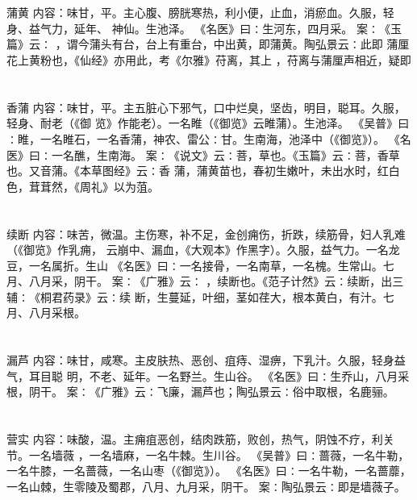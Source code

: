 \documentclass[12pt,UTF8]{ctexbook}
\begin{document}
\chapter{}蒲黄
内容：味甘，平。主心腹、膀胱寒热，利小便，止血，消瘀血。久服，轻身、益气力，延年、 
神仙。生池泽。 
《名医》曰∶生河东，四月采。 
案∶《玉篇》云∶ ，谓今蒲头有台，台上有重台，中出黄，即蒲黄。陶弘景云∶此即 
蒲厘花上黄粉也，《仙经》亦用此，考《尔雅》苻离，其上 ，苻离与蒲厘声相近，疑即 


\chapter{}香蒲
内容：味甘，平。主五脏心下邪气，口中烂臭，坚齿，明目，聪耳。久服，轻身、耐老（《御 
览》作能老）。一名睢（《御览》云睢蒲）。生池泽。 
《吴普》曰∶睢，一名睢石，一名香蒲，神农、雷公∶甘。生南海，池泽中（《御览》）。 
《名医》曰∶一名醮，生南海。 
案∶《说文》云∶菩，草也。《玉篇》云∶菩，香草也。又音蒲。《本草图经》云∶香 
蒲，蒲黄苗也，春初生嫩叶，未出水时，红白色，茸茸然，《周礼》以为菹。 


\chapter{}续断
内容：味苦，微温。主伤寒，补不足，金创痈伤，折跌，续筋骨，妇人乳难（《御览》作乳痈， 
云崩中、漏血，《大观本》作黑字）。久服，益气力。一名龙豆，一名属折。生山 
《名医》曰∶一名接骨，一名南草，一名槐。生常山。七月、八月采，阴干。 
案∶《广雅》云∶ ，续断也。《范子计然》云∶续断，出三辅∶《桐君药录》云∶续 
断，生蔓延，叶细，茎如荏大，根本黄白，有汁。七月、八月采根。 


\chapter{}漏芦
内容：味甘，咸寒。主皮肤热、恶创、疽痔、湿痹，下乳汁。久服，轻身益气，耳目聪 
明，不老、延年。一名野兰。生山谷。 
《名医》曰∶生乔山，八月采根，阴干。 
案∶《广雅》云∶飞廉，漏芦也；陶弘景云∶俗中取根，名鹿骊。 


\chapter{}营实
内容：味酸，温。主痈疽恶创，结肉跌筋，败创，热气，阴蚀不疗，利关节。一名墙薇 
，一名墙麻，一名牛棘。生川谷。 
《吴普》曰∶蔷薇，一名牛勒，一名牛膝，一名蔷薇，一名山枣（《御览》）。 
《名医》曰∶一名牛勒，一名蔷蘼，一名山棘，生零陵及蜀郡，八月、九月采，阴干。 
案∶陶弘景云∶即是墙薇子。 
\end{document}
